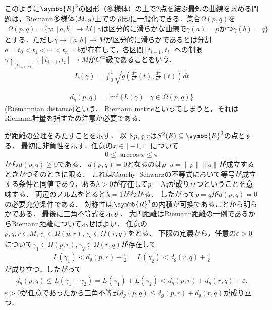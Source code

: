 \documentclass{ltjsbook}
\begin{document}
このように\(\symbb{R}^3\)の図形（多様体）の上で\(2\)点を結ぶ最短の曲線を求める問題は，Riemann多様体\((M, g)\)上での問題に一般化できる．集合\(\Omega(p, q)\)を
\begin{align*}
    \Omega(p, q) = \{%
        \gamma\colon [a, b] \to M \mid
        \text{\(\gamma\)は区分的に滑らかな曲線で\(\gamma(a) = p\)かつ\(\gamma(b) = q\)}
    \}
\end{align*}
とする．ただし\(\gamma\to [a, b] \to M\)が区分的に滑らかであるとは分割\(a = t_0 < t_1 < \cdots < t_n = b\)が存在して，各区間\([t_{i - 1}, t_i]\)への制限\(\gamma\restriction_{[t_{i - 1}, t_{i}]}\colon [t_{i - 1}, t_i] \to M\)が\(C^\infty\)級であることをいう．
\begin{align*}
    L(\gamma) = \int_{0}^{1} \sqrt{g\left(\frac{d\gamma}{dt}(t), \frac{d\gamma}{dt}(t)\right)} dt
\end{align*}

\begin{align}
    d_g(p, q) = \inf \{L(\gamma) \mid \gamma \in \Omega(p, q)\}
\end{align}
(Riemannian distance)という．
Riemann metricといってしまうと，それはRiemann計量を指すため注意が必要である．


が距離の公理をみたすことを示す．
以下\(p, q, r\)は\(S^2(R) \subseteq \symbb{R}^3\)の点とする．
最初に非負性を示す．任意の\(x \in [-1 , 1]\)について
\begin{align*}
    0 \leq \arccos x \leq \pi
\end{align*}
から\(d(p, q) \geq 0\)である．
\(d(p, q) = 0\)となるのは\(p \cdot q = \lVert p \rVert \lVert q \rVert\)が成立するときかつそのときに限る．
これはCauchy--Schwarzの不等式において等号が成立する条件と同値であり，ある\(\lambda > 0\)が存在して\(p = \lambda q\)が成り立つということを意味する．
両辺のノルムをとると\(\lambda = 1\)がわかる．
したがって\(p = q\)が\(d(p, q) = 0\)の必要充分条件である．
対称性は\(\symbb{R}^3\)の内積が可換であることから明らかである．
最後に三角不等式を示す．
大円距離はRiemann距離の一例であるからRiemann距離について示せばよい．
任意の\(p, q, r\in M, \gamma_1 \in \Omega(p, r), \gamma_2 \in \Omega(r, q)\)をとる．
下限の定義から，任意の\(\varepsilon > 0\)について\(\gamma_1 \in \Omega(p, r), \gamma_2 \in \Omega(r, q)\)が存在して
\begin{gather*}
    L(\gamma_1) < d_g(p, r) + \frac{\varepsilon}{2},
    \quad
    L(\gamma_2) < d_g(r, q) + \frac{\varepsilon}{2}
\end{gather*}
が成り立つ．したがって
\begin{align*}
    d_g(p, q) \leq L(\gamma_1 + \gamma_2)
            = L(\gamma_1) + L(\gamma_2)
            < d_g(p, r) + d_g(r, q) + \varepsilon.
\end{align*}
\(\varepsilon > 0\)が任意であったから三角不等式\(d_g(p, q) \leq d_g(p, r) + d_g(r, q)\)が成り立つ．
\end{document}
